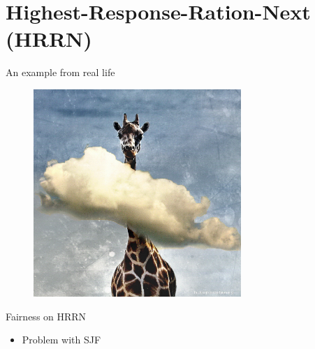 \documentclass[10pt, compress, aspectratio=169]{beamer}
\begin{document}
\section{Highest-Response-Ration-Next (HRRN)}
\begin{frame}{An example from real life}
  \begin{figure}[ht]
    \centering
    \includegraphics[width=0.7\textwidth, keepaspectratio=true]{images/hrrn.jpg}
  \end{figure}
\end{frame}

\begin{frame}{Fairness on HRRN}
  \begin{itemize}
    \item Problem with SJF
  \end{itemize}
\end{frame}
\end{document}
